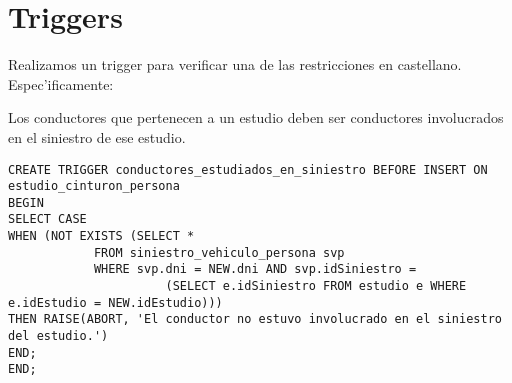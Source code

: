 \section{Triggers}

Realizamos un trigger para verificar una de las restricciones en castellano. Espec'ificamente:

\begin{textit}
Los conductores que pertenecen a un estudio deben ser conductores involucrados en el siniestro de ese estudio.
\end{textit}

\begin{verbatim}
CREATE TRIGGER conductores_estudiados_en_siniestro BEFORE INSERT ON estudio_cinturon_persona
BEGIN
SELECT CASE
WHEN (NOT EXISTS (SELECT *
            FROM siniestro_vehiculo_persona svp
            WHERE svp.dni = NEW.dni AND svp.idSiniestro = 
                      (SELECT e.idSiniestro FROM estudio e WHERE e.idEstudio = NEW.idEstudio)))
THEN RAISE(ABORT, 'El conductor no estuvo involucrado en el siniestro del estudio.')
END;
END;
\end{verbatim}